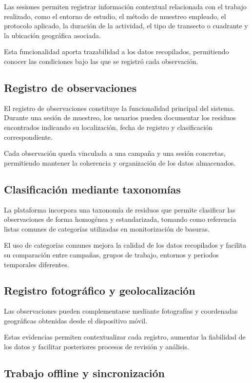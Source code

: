 Las sesiones permiten registrar información contextual relacionada con el trabajo realizado, como el entorno de estudio, el método de muestreo empleado, el protocolo aplicado, la duración de la actividad, el tipo de transecto o cuadrante y la ubicación geográfica asociada.

Esta funcionalidad aporta trazabilidad a los datos recopilados, permitiendo conocer las condiciones bajo las que se registró cada observación.

\subsection{Registro de observaciones}

El registro de observaciones constituye la funcionalidad principal del sistema. Durante una sesión de muestreo, los usuarios pueden documentar los residuos encontrados indicando su localización, fecha de registro y clasificación correspondiente.

Cada observación queda vinculada a una campaña y una sesión concretas, permitiendo mantener la coherencia y organización de los datos almacenados.

\subsection{Clasificación mediante taxonomías}

La plataforma incorpora una taxonomía de residuos que permite clasificar las observaciones de forma homogénea y estandarizada, tomando como referencia listas comunes de categorías utilizadas en monitorización de basuras.

El uso de categorías comunes mejora la calidad de los datos recopilados y facilita su comparación entre campañas, grupos de trabajo, entornos y periodos temporales diferentes.

\subsection{Registro fotográfico y geolocalización}

Las observaciones pueden complementarse mediante fotografías y coordenadas geográficas obtenidas desde el dispositivo móvil.

Estas evidencias permiten contextualizar cada registro, aumentar la fiabilidad de los datos y facilitar posteriores procesos de revisión y análisis.

\subsection{Trabajo offline y sincronización}


